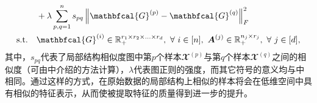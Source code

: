 \begin{enumerate}
\begin{equation*}
\begin{aligned}
    \span && + \lambda\sum_{p,q=1}^{n}s_{pq}\norm{\mathbfcal{G}^{(p)}-\mathbfcal{G}^{(q)}}_{F}^{2} \\
    &\text{s.t.} && \mathbfcal{G}^{(i)}\in\mathbb{R}_{+}^{r_1 \times r_2 \times \ldots \times r_d},~\forall~i\in[n] ,~\boldsymbol{A}^{(j)}\in \mathbb{R}_{+}^{n_j \times r_j},~\forall~j\in[d],
    \end{aligned}
\end{equation*}
其中，$s_{pq}$代表了局部结构相似度图中第$p$个样本$\mathbfcal{X}^{(p)}$与第$q$个样本$\mathbfcal{X}^{(q)}$之间的相似度（可由中介绍的方法计算），$\lambda$代表图正则的强度，而其它符号的意义均与中相同。通过这样的方式，在原始数据的局部结构上相似的样本将会在低维空间中具有相似的特征表示，从而使被提取特征的质量得到进一步的提升。
\end{enumerate}





\afterpage{\null\newpage}\clearpage